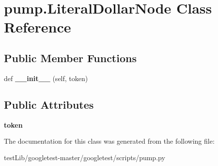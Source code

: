 \hypertarget{classpump_1_1LiteralDollarNode}{}\section{pump.\+Literal\+Dollar\+Node Class Reference}
\label{classpump_1_1LiteralDollarNode}
\subsection*{Public Member Functions}
\begin{DoxyCompactItemize}
\item 
\mbox{\label{classpump_1_1LiteralDollarNode_a181cccad8a48f7dfdd0716e427897e0b}} 
def {\bfseries \+\_\+\+\_\+init\+\_\+\+\_\+} (self, token)
\end{DoxyCompactItemize}
\subsection*{Public Attributes}
\begin{DoxyCompactItemize}
\item 
\mbox{\label{classpump_1_1LiteralDollarNode_ab4c6e209635b8868bcdf0fe8053431c6}} 
{\bfseries token}
\end{DoxyCompactItemize}


The documentation for this class was generated from the following file\+:\begin{DoxyCompactItemize}
\item 
test\+Lib/googletest-\/master/googletest/scripts/pump.\+py\end{DoxyCompactItemize}

